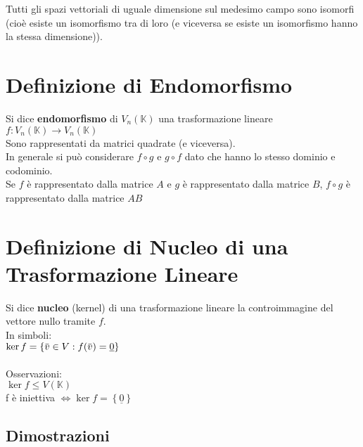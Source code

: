 \documentclass[a4paper, twoside, italian, 11pt]{book}
\newcommand{\braces}[1] {\left \{ #1 \right \}}
\newcommand{\overbar}[1] {\mkern 1.5mu\overline{\mkern-1.5mu#1\mkern-1.5mu}\mkern 1.5mu}
\newcommand{\K}{\mathbb K}
\begin{document}
\noindent
Tutti gli spazi vettoriali di uguale dimensione sul medesimo campo sono isomorfi (cioè esiste un isomorfismo tra di loro (e viceversa se esiste un isomorfismo hanno la stessa dimensione)).



\section{Definizione di Endomorfismo}

Si dice \textbf{endomorfismo} di $V_n(\K)$ una trasformazione lineare $f : V_n(\K) \rightarrow V_n(\K)$ \\

\noindent
Sono rappresentati da matrici quadrate (e viceversa). \\

\noindent
In generale si può considerare $f \circ g$ e $g \circ f$ dato che hanno lo stesso dominio e codominio. \\

\noindent
Se $f$ è rappresentato dalla matrice $A$ e $g$ è rappresentato dalla matrice $B$, $f \circ g$ è rappresentato dalla matrice $AB$



\section{Definizione di Nucleo di una Trasformazione Lineare}

Si dice \textbf{nucleo} (kernel) di una trasformazione lineare la controimmagine del vettore nullo tramite $f$. \\

\noindent
In simboli: \\

$\ker f = \braces{\overbar v \in V : f(\overbar v) = \underline 0}$ \\\\

\noindent
Osservazioni: \\

$\ker f \leq V(\K)$ \\

f è iniettiva $\iff \ker f = \braces{\underline 0}$


\subsection{Dimostrazioni}

\end{document}
